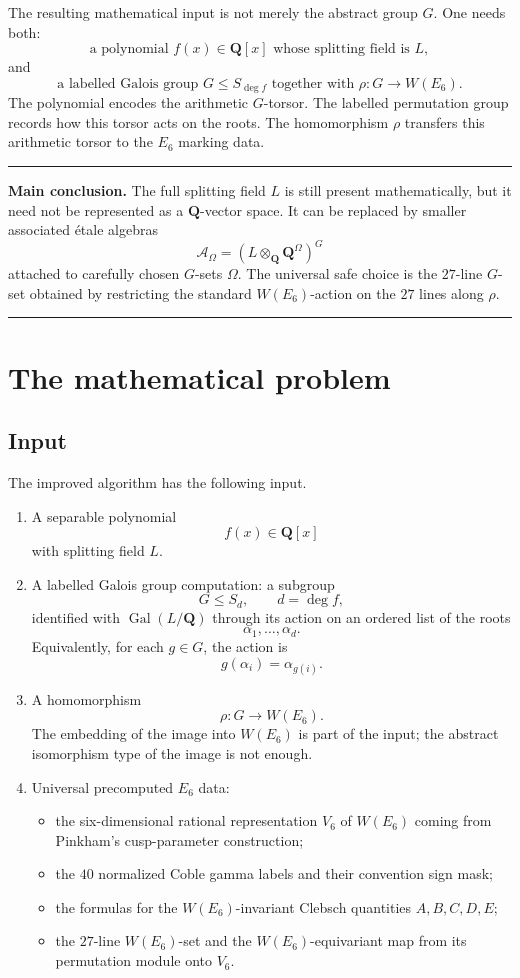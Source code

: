 \documentclass[11pt]{article}
\newcommand{\QQ}{\mathbf{Q}}
\newcommand{\Gal}{\operatorname{Gal}}
\newcommand{\cA}{\mathcal{A}}
\newcommand{\W}{W(E_6)}
\newcommand{\V}{V_6}
\newenvironment{summarybox}{%
  \begin{center}\begin{minipage}{0.94\textwidth}\small
  \hrule\vspace{0.55em}%
}{%
  \vspace{0.55em}\hrule\end{minipage}\end{center}%
}
\begin{document}
The resulting mathematical input is not merely the abstract group $G$.  One needs
both:
\[
  \boxed{\text{a polynomial }f(x)\in\QQ[x]\text{ whose splitting field is }L,}
\]
and
\[
  \boxed{\text{a labelled Galois group }G\leq S_{\deg f}\text{ together with }
  \rho:G\to\W.}
\]
The polynomial encodes the arithmetic $G$-torsor.  The labelled permutation group
records how this torsor acts on the roots.  The homomorphism $\rho$ transfers this
arithmetic torsor to the $E_6$ marking data.

\begin{summarybox}
\textbf{Main conclusion.}
The full splitting field $L$ is still present mathematically, but it need not be
represented as a $\QQ$-vector space.  It can be replaced by smaller associated
\'{e}tale algebras
\[
  \cA_\Omega=(L\otimes_\QQ \QQ^\Omega)^G
\]
attached to carefully chosen $G$-sets $\Omega$.  The universal safe choice is the
$27$-line $G$-set obtained by restricting the standard $W(E_6)$-action on the
$27$ lines along $\rho$.
\end{summarybox}

\section{The mathematical problem}

\subsection{Input}

The improved algorithm has the following input.

\begin{enumerate}[label=\textbf{Input \arabic*.}]
\item A separable polynomial
\[
  f(x)\in \QQ[x]
\]
with splitting field $L$.

\item A labelled Galois group computation: a subgroup
\[
  G\leq S_d,\qquad d=\deg f,
\]
identified with $\Gal(L/\QQ)$ through its action on an ordered list of the roots
\[
  \alpha_1,\ldots,\alpha_d.
\]
Equivalently, for each $g\in G$, the action is
\[
  g(\alpha_i)=\alpha_{g(i)}.
\]

\item A homomorphism
\[
  \rho:G\longrightarrow \W.
\]
The embedding of the image into $\W$ is part of the input; the abstract isomorphism
type of the image is not enough.

\item Universal precomputed $E_6$ data:
\begin{itemize}
\item the six-dimensional rational representation
$\V$ of $\W$ coming from Pinkham's cusp-parameter construction;
\item the $40$ normalized Coble gamma labels and their convention sign mask;
\item the formulas for the $W(E_6)$-invariant Clebsch quantities
$A,B,C,D,E$;
\item the $27$-line $W(E_6)$-set and the $W(E_6)$-equivariant map from its
permutation module onto $\V$.
\end{itemize}
\end{enumerate}
\end{document}
